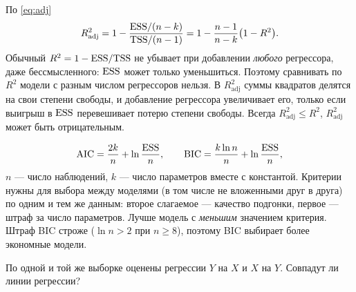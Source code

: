 \begin{solution}
По \eqref{eq:adj}
\[
  R^2_{\text{adj}} = 1 - \frac{\mathrm{ESS}/(n-k)}{\mathrm{TSS}/(n-1)}
                   = 1 - \frac{n-1}{n-k}\bigl(1 - R^2\bigr).
\]
Обычный $R^2 = 1 - \mathrm{ESS}/\mathrm{TSS}$ не убывает при добавлении \emph{любого}
регрессора, даже бессмысленного: $\mathrm{ESS}$ может только уменьшиться. Поэтому
сравнивать по $R^2$ модели с разным числом регрессоров нельзя. В
$R^2_{\text{adj}}$ суммы квадратов делятся на свои степени свободы, и
добавление регрессора увеличивает его, только если выигрыш в $\mathrm{ESS}$
перевешивает потерю степени свободы. Всегда $R^2_{\text{adj}} \le R^2$,
$R^2_{\text{adj}}$ может быть отрицательным.

\[
  \mathrm{AIC} = \frac{2k}{n} + \ln\frac{\mathrm{ESS}}{n},
  \qquad
  \mathrm{BIC} = \frac{k\ln n}{n} + \ln\frac{\mathrm{ESS}}{n},
\]
$n$ — число наблюдений, $k$ — число параметров вместе с константой. Критерии
нужны для выбора между моделями (в том числе не вложенными друг в друга) по
одним и тем же данным: второе слагаемое — качество подгонки, первое — штраф
за число параметров. Лучше модель с \emph{меньшим} значением критерия. Штраф
BIC строже ($\ln n > 2$ при $n \ge 8$), поэтому BIC выбирает более экономные
модели.
\end{solution}


По одной и той же выборке оценены регрессии $Y$ на $X$ и $X$ на $Y$.
Совпадут ли линии регрессии?

